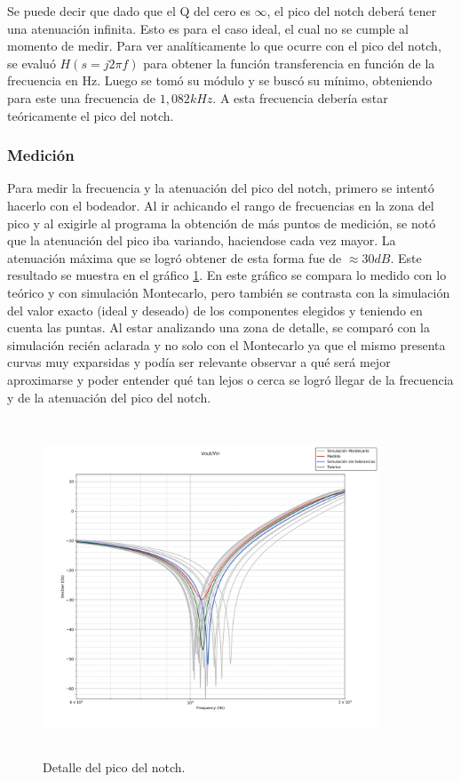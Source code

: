 Se puede decir que dado que el Q del cero es $\infty$, el pico del notch deber\'a tener una atenuaci\'on infinita. Esto es para el caso ideal, el cual no se cumple al momento de medir. Para ver anal\'iticamente lo que ocurre con el pico del notch, se evalu\'o $H(s=j2\pi f)$ para obtener la funci\'on transferencia en funci\'on de la frecuencia en Hz. Luego se tom\'o su m\'odulo y se busc\'o su m\'inimo, obteniendo para este una frecuencia de $1,082kHz$. A esta frecuencia deber\'ia estar te\'oricamente el pico del notch.

\subsubsection{Medici\'on} 
Para medir la frecuencia y la atenuaci\'on del pico del notch, primero se intent\'o hacerlo con el bodeador. Al ir achicando el rango de frecuencias en la zona del pico y al exigirle al programa la obtenci\'on de m\'as puntos de medici\'on, se not\'o que la atenuaci\'on del pico iba variando, haciendose cada vez mayor. La atenuaci\'on m\'axima que se logr\'o obtener de esta forma fue de $\approx 30dB$. Este resultado se muestra en el gr\'afico \ref{pico}. En este gr\'afico se compara lo medido con lo te\'orico y con simulaci\'on Montecarlo, pero tambi\'en se contrasta con la simulaci\'on del valor exacto (ideal y deseado) de los componentes elegidos y teniendo en cuenta las puntas. Al estar analizando una zona de detalle, se compar\'o con la simulaci\'on reci\'en aclarada y no solo con el Montecarlo ya que el mismo presenta curvas muy exparsidas y pod\'ia ser relevante observar a qu\'e ser\'a mejor aproximarse y poder entender qu\'e tan lejos o cerca se logr\'o llegar de la frecuencia y de la atenuaci\'on del pico del notch.

\begin{figure}[H] %
	\centering
	\includegraphics[width=10cm,height=10cm,keepaspectratio]{../EJ1/00GRAFICOS/pico.png}
	\caption{Detalle del pico del notch.}
	\label{pico}
\end{figure}

